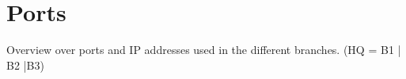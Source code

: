 \chapter{Ports}\label{app:Ports}
Overview over ports and IP addresses used in the different branches. (HQ = B1 | B2 |B3)

